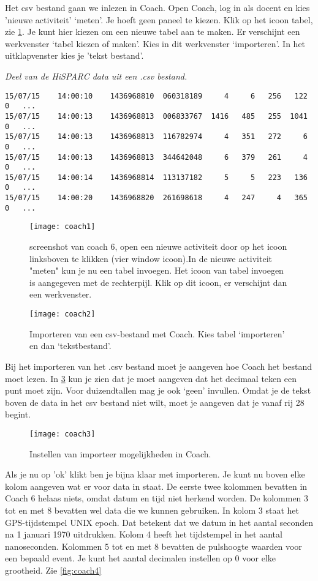 Het csv bestand gaan we inlezen in Coach. Open Coach, log in als docent en kies 'nieuwe activiteit' 
`meten'. Je hoeft geen paneel te kiezen.
Klik op het icoon tabel, zie \ref{fig:coach1}. Je kunt hier kiezen om een
nieuwe tabel aan te maken. Er verschijnt een werkvenster `tabel kiezen of maken'.
Kies in dit werkvenster `importeren'. In het uitklapvenster kies je 'tekst bestand'.

\textit{Deel van de HiSPARC data uit een .csv bestand.}
\begin{verbatim}
15/07/15	14:00:10	1436968810	060318189     4	    6	256	  122	0	...	
15/07/15	14:00:13	1436968813	006833767  1416	  485	255	 1041  0   ...
15/07/15	14:00:13	1436968813	116782974     4	  351	272	    6	0	...
15/07/15	14:00:13	1436968813	344642048     6	  379	261	    4	0	...	
15/07/15	14:00:14	1436968814	113137182     5	    5	223	  136	0	...	
15/07/15	14:00:20	1436968820	261698618     4	  247	  4	  365	0	...
\end{verbatim}

\begin{figure}
    \centering
    \texttt{[image: coach1]}
    \caption{screenshot van coach 6, open een nieuwe activiteit door op 
    het icoon linksboven te klikken (vier window icoon).In de nieuwe activiteit 
    "meten" kun je nu een tabel invoegen. Het icoon van tabel invoegen is 
    aangegeven met de rechterpijl. Klik op dit icoon, er verschijnt dan een werkvenster.}
    \label{fig:coach1}
\end{figure}

\begin{figure}
    \centering
    \texttt{[image: coach2]}
    \caption{Importeren van een csv-bestand met Coach. Kies tabel `importeren' en
    dan `tekstbestand'.}
    \label{fig:coach2}
\end{figure}

Bij het importeren van het .csv bestand moet je aangeven hoe Coach het bestand moet 
lezen. In \ref{fig:coach3} kun je zien dat je moet aangeven dat het decimaal teken
een punt moet zijn. Voor duizendtallen mag je ook `geen' invullen. Omdat je de tekst
boven de data in het csv bestand niet wilt, moet je aangeven dat je vanaf rij 
28 begint.

\begin{figure}
    \centering
    \texttt{[image: coach3]}
    \caption{Instellen van importeer mogelijkheden in Coach.}
    \label{fig:coach3}
\end{figure}
   
Als je nu op 'ok' klikt ben je bijna klaar met importeren. Je kunt nu boven elke
kolom aangeven wat er voor data in staat. De eerste twee kolommen bevatten in Coach 6 
helaas niets, omdat datum en tijd niet herkend worden. De kolommen 3 tot en met 
8 bevatten wel data die we kunnen gebruiken. In kolom 3 staat het GPS-tijdstempel UNIX epoch.
Dat betekent dat we datum in het aantal seconden na 1 januari 1970 uitdrukken.
Kolom 4 heeft het tijdstempel in het aantal nanoseconden.
Kolommen 5 tot en met 8 bevatten de pulshoogte waarden voor een bepaald event.
Je kunt het aantal decimalen instellen op 0 voor elke grootheid. Zie \ref{fig:coach4} 

